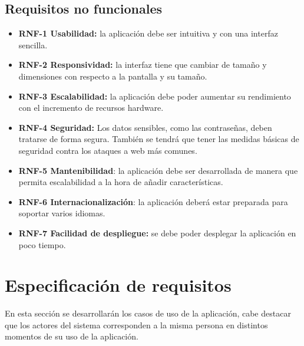 \subsection{Requisitos no funcionales}

\begin{itemize}
\tightlist
\item
  \textbf{RNF-1 Usabilidad:} la aplicación debe ser intuitiva y con una interfaz sencilla.
\item
  \textbf{RNF-2 Responsividad:} la interfaz tiene que cambiar de tamaño y dimensiones con respecto a la pantalla y su tamaño.
\item
  \textbf{RNF-3 Escalabilidad:} la aplicación debe poder aumentar su rendimiento con el incremento de recursos hardware.
\item
  \textbf{RNF-4 Seguridad:} Los datos sensibles, como las contraseñas, deben tratarse de forma segura. También se tendrá que tener las medidas básicas de seguridad contra los ataques a web más comunes.
\item
  \textbf{RNF-5 Mantenibilidad}: la aplicación debe ser desarrollada de manera que permita escalabilidad a la hora de añadir características. 
\item
  \textbf{RNF-6 Internacionalización}: la aplicación deberá estar preparada para soportar varios idiomas.
\item
  \textbf{RNF-7 Facilidad de despliegue:} se debe poder desplegar la aplicación en poco tiempo.
\end{itemize}

\section{Especificación de requisitos}
En esta sección se desarrollarán los casos de uso de la aplicación, cabe destacar que los actores del sistema corresponden a la misma persona en distintos momentos de su uso de la aplicación.


